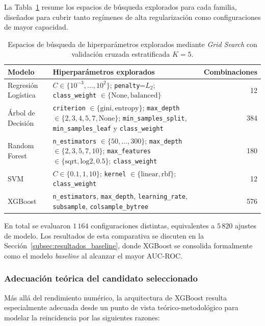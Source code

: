 \documentclass[11pt,a4paper]{article}
\begin{document}
La Tabla~\ref{tab:espacios_hiperparametros} resume los espacios de búsqueda explorados para cada familia, diseñados para cubrir tanto regímenes de alta regularización como configuraciones de mayor capacidad.

\begin{table}[H]
    \centering
    \footnotesize
    \begin{tabular}{p{3.2cm} p{10cm} r}
        \toprule
        \textbf{Modelo} & \textbf{Hiperparámetros explorados} & \textbf{Combinaciones} \\
        \midrule
        Regresión Logística & $C \in \{10^{-3},\dots,10^{2}\}$; \texttt{penalty}=$L_2$; \texttt{class\_weight} $\in \{\text{None},\text{balanced}\}$ & 12 \\
        Árbol de Decisión & \texttt{criterion} $\in \{\text{gini},\text{entropy}\}$; \texttt{max\_depth} $\in \{2,3,4,5,7,\text{None}\}$; \texttt{min\_samples\_split}, \texttt{min\_samples\_leaf} y \texttt{class\_weight} & 384 \\
        Random Forest & \texttt{n\_estimators} $\in \{50,\dots,300\}$; \texttt{max\_depth} $\in \{2,3,5,7,10\}$; \texttt{max\_features} $\in \{\text{sqrt},\text{log2},0.5\}$; \texttt{class\_weight} & 180 \\
        SVM & $C \in \{0.1,1,10\}$; \texttt{kernel} $\in \{\text{linear},\text{rbf}\}$; \texttt{class\_weight} & 12 \\
        XGBoost & \texttt{n\_estimators}, \texttt{max\_depth}, \texttt{learning\_rate}, \texttt{subsample}, \texttt{colsample\_bytree} & 576 \\
        \bottomrule
    \end{tabular}
    \caption{Espacios de búsqueda de hiperparámetros explorados mediante \textit{Grid Search} con validación cruzada estratificada $K=5$.}
    \label{tab:espacios_hiperparametros}
\end{table}

En total se evaluaron $1\,164$ configuraciones distintas, equivalentes a $5\,820$ ajustes de modelo. Los resultados de esta comparativa se discuten en la Sección~\ref{subsec:resultados_baseline}, donde XGBoost se consolida formalmente como el modelo \textit{baseline} al alcanzar el mayor AUC-ROC.

\subsubsection{Adecuación teórica del candidato seleccionado}

Más allá del rendimiento numérico, la arquitectura de XGBoost resulta especialmente adecuada desde un punto de vista teórico-metodológico para modelar la reincidencia por las siguientes razones:
\end{document}
